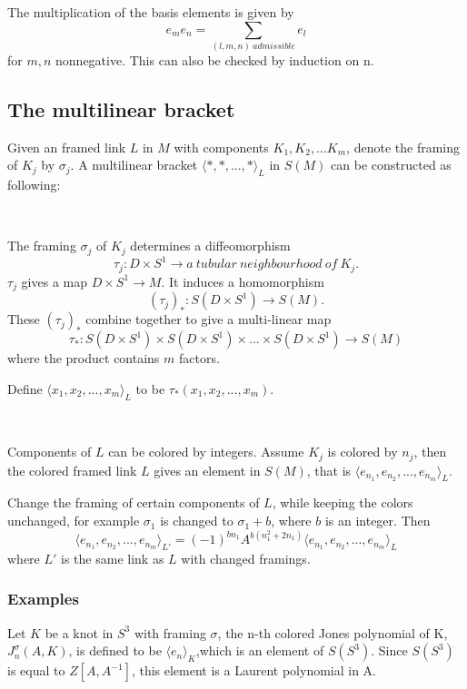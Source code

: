 The multiplication of the basis elements is given by
\[ e_m e_n=\sum_{(l,m,n)\ admissible} e_l\]
for $m,n$ nonnegative.
This can also be checked by induction on n.

\subsection{The multilinear bracket}\label{multilinear bracket}
Given an framed link $L$ in $M$ with components $K_1,K_2,...K_m$, denote the framing of $K_j$ by $\sigma_j$. A multilinear
bracket $\langle *,*,...,*\rangle_L$ in $S(M)$ can be constructed as following:

\

The framing $\sigma_j$ of $K_j$ determines a diffeomorphism
\[\tau_j:D\times S^1 \to a\ tubular\ neighbourhood\ of\ K_j.\]
$\tau_j$ gives a map $D\times S^1 \to M$. It induces a homomorphism
\[(\tau_j)_*:S(D\times S^1) \to S(M).\]
These $(\tau_j)_*$ combine
together to give a multi-linear map \[\tau_*: S(D\times
S^1)\times S(D\times S^1)\times ...\times S(D\times S^1)\to S(M)\]
where the product contains $m$ factors.

Define $\langle
x_1,x_2,...,x_m\rangle_L$ to be $\tau_*(x_1,x_2,...,x_m)$.


\

Components of $L$ can be colored by integers. Assume $K_j$ is colored by $n_j$, then the colored framed link $L$ gives an element in $S(M)$, that is $\langle e_{n_1},e_{n_2},...,e_{n_m}\rangle_L$.

\begin{remark}
Change the framing of certain components of $L$, while keeping the colors unchanged, for example $\sigma_1$ is changed to $\sigma_1+b$, where $b$ is an integer. Then
\[\langle e_{n_1},e_{n_2},...,e_{n_m}\rangle_{L'}=(-1)^{bn_1}A^{b(n_1^2+2n_1)}\langle e_{n_1},e_{n_2},...,e_{n_m}\rangle_L\]
where $L'$ is the same link as $L$ with changed framings.
\end{remark}



\subsubsection{Examples}\label{examples}
 Let $K$ be a knot in $S^3$ with framing $\sigma$, the n-th colored Jones polynomial of K, $J_n^{\sigma}(A,K)$, is defined to be $\langle e_n
\rangle_K$,which is an element of $S(S^3)$. Since $S(S^3)$ is equal to $Z[A,A^{-1}]$, this element is a Laurent polynomial in A.

